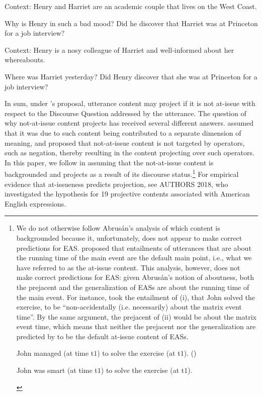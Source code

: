 \documentclass[11pt,fleqn]{article}
\newcommand{\6}{\mbox{$[\hspace*{-.6mm}[$}}
\newcommand{\9}{\mbox{$]\hspace*{-.6mm}]$}}
\newcommand{\citepos}[1]{\citeauthor{#1}'s \citeyear{#1}}
\begin{document}
\begin{exe}
\ex\label{discover3}
\begin{xlist}

\ex Context: Henry and Harriet are an academic couple that lives on the West Coast. 
\begin{xlist}
 Why is Henry in such a bad mood?
 Did he discover that Harriet was at Princeton for a job interview?
\end{xlist}

\ex Context: Henry is a nosy colleague of Harriet and well-informed about her whereabouts.
\begin{xlist}
 Where was Harriet yesterday?
 Did Henry discover that she was at Princeton for a job interview?
\end{xlist}

\end{xlist}
\end{exe}
In sum, under \citepos{best-question} proposal, utterance content may project if it is not at-issue with respect to the Discourse Question addressed by the utterance. The question of why not-at-issue content projects has received several different answers. \citet{potts05} assumed that it was due to such content being contributed to a separate dimension of meaning, and \citet{brst-salt10} proposed that not-at-issue content is not targeted by operators, such as negation, thereby resulting in the content projecting over such operators. In this paper, we follow \citealt{abrusan2011,abrusan2016} in assuming that the not-at-issue content is backgrounded and projects as a result of its discourse status.\footnote{We do not otherwise follow Abrus\'an's analysis of which content is backgrounded because it, unfortunately, does not appear to make correct predictions for EAS. \citet{abrusan2011} proposed that entailments of utterances that are about the running time of the main event are the default main point, i.e., what we have referred to as the at-issue content. This analysis, however, does not make correct predictions for EAS: given Abrus\'an's notion of aboutness, both the prejacent and the generalization of EASs are about the running time of the main event. For instance, \citet[508]{abrusan2011} took the entailment of (i), that John solved the exercise, to be ``non-accidentally (i.e. necessarily) about the matrix event time''. By the same argument, the prejacent of (ii) would be about the matrix event time, which means that neither the prejacent nor the generalization are predicted by \citealt{abrusan2011} to be the default at-issue content of EASs.

\begin{exe}
 John managed (at time t$ {\mbox{1}}$) to solve the exercise (at t$ {\mbox{1}}$). \hfill (\citealt[508]{abrusan2011})

 John was smart (at time t$ {\mbox{1}}$) to solve the exercise (at t$ {\mbox{1}}$).

\end{exe}} For empirical evidence that at-issueness predicts projection, see AUTHORS 2018, who investigated the hypothesis for 19 projective contents associated with American English expressions. 
\end{document}
